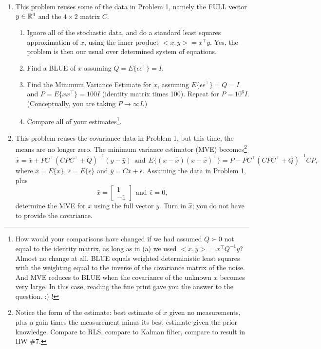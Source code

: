 \documentclass[letterpaper]{article}
\begin{document}
\begin{enumerate}
\item This problem reuses some of the data in Problem 1, namely the FULL vector $y\in \mathbb R^4$ and the $4 \times 2$ matrix $C$.

        \begin{enumerate}
\setlength{\itemsep}{.1in}
\renewcommand{\labelenumi}{(\alph{enumi})}

\item  Ignore all of the stochastic data, and do a standard least squares approximation of $x$, using the inner product $<x,y>=x^\top y$. Yes, the problem is then our usual over determined system of equations.

\item  Find a BLUE of $x$ assuming $Q=E\{ \epsilon \epsilon^\top \} =I$.

\item  Find the Minimum Variance Estimate for $x$, assuming $E\{ \epsilon \epsilon^\top \} = Q=I$ and $P =E\{ x x^\top \} =  100 I$ (identity matrix times 100). Repeat for $P=10^6 I$. (Conceptually, you are taking $P \to \infty I$.)

\item  Compare all of your estimates\footnote{How would your comparisons have changed if we had assumed $Q \succ 0$ not equal to the identity matrix, as long as  in (a) we used $<x,y>=x^\top Q^{-1} y$? Almost no change at all. BLUE equals weighted deterministic least squares with the weighting equal to the inverse of the covariance matrix of the noise. And MVE reduces to BLUE when the covariance of the unknown $x$ becomes very large. In this case, reading the fine print gave you the answer to the question. :) !}.

\end{enumerate}


\item This problem reuses the covariance data in Problem 1, but this time, the means are no longer zero. The  minimum variance estimator (MVE) becomes\footnote{Notice the form of the estimate: best estimate of $x$ given no measurements, plus a gain times the measurement minus its best estimate given the prior knowledge. Compare to RLS, compare to Kalman filter, compare to result in HW \#7.}
$$ \widehat{x}=\bar{x} + PC^\top ( C P C^\top + Q)^{-1} (y - \bar{y})~~\mbox{and}~~E\{ (x-\hat{x})(x-\hat{x})^\top \}=P - PC^\top(CPC^\top + Q)^{-1}CP,$$
where  $\bar{x} = E\{ x\}$, $\bar{\epsilon}=E\{ \epsilon \}$ and $\bar{y} = C \bar{x} + \bar{\epsilon}$. Assuming the data in Problem 1, plus
    $$ \bar{x}=\left[\begin{array}{r}  1\\   -1\end{array} \right] ~~\text{and}~~ \bar{\epsilon}=0,$$
    determine the MVE for $x$ using the full vector $y$. Turn in $\widehat{x}$; you do not have to provide the covariance.


\end{enumerate}
\end{document}
